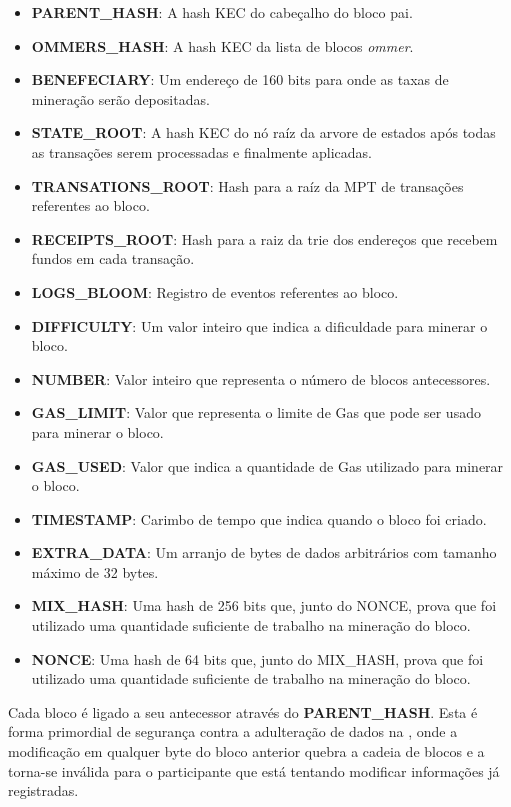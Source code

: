 \documentclass[tcc,capa]{texufpel}
\begin{document}
	\begin{itemize}
	    \item \textbf{PARENT\_HASH}: A hash KEC do cabeçalho do bloco pai.
	    \item \textbf{OMMERS\_HASH}: A hash KEC da lista de blocos \textit{ommer}.
	    \item \textbf{BENEFECIARY}: Um endereço de 160 bits para onde as taxas de mineração serão depositadas.
	    \item \textbf{STATE\_ROOT}: A hash KEC do nó raíz da arvore de estados após todas as transações serem processadas e finalmente aplicadas.
	    \item \textbf{TRANSATIONS\_ROOT}: Hash para a raíz da MPT de transações referentes ao bloco.
	    \item \textbf{RECEIPTS\_ROOT}: Hash para a raiz da trie dos endereços que recebem fundos em cada transação.
	    \item \textbf{LOGS\_BLOOM}: Registro de eventos referentes ao bloco.
	    \item \textbf{DIFFICULTY}: Um valor inteiro que indica a dificuldade para minerar o bloco.
	    \item \textbf{NUMBER}: Valor inteiro que representa o número de blocos antecessores.
	    \item \textbf{GAS\_LIMIT}: Valor que representa o limite de Gas que pode ser usado para minerar o bloco.
	    \item \textbf{GAS\_USED}: Valor que indica a quantidade de Gas utilizado para minerar o bloco.
	    \item \textbf{TIMESTAMP}: Carimbo de tempo que indica quando o bloco foi criado.
	    \item \textbf{EXTRA\_DATA}: Um arranjo de bytes de dados arbitrários com tamanho máximo de 32 bytes.
	    \item \textbf{MIX\_HASH}: Uma hash de 256 bits que, junto do NONCE, prova que foi utilizado uma quantidade suficiente de trabalho na mineração do bloco.
	    \item \textbf{NONCE}: Uma hash de 64 bits que, junto do MIX\_HASH, prova que foi utilizado uma quantidade suficiente de trabalho na mineração do bloco.
	\end{itemize}
	
	Cada bloco é ligado a seu antecessor através do \textbf{PARENT\_HASH}. Esta é forma primordial de segurança contra a adulteração de dados na \bchain, onde a modificação em qualquer byte do bloco anterior quebra a cadeia de blocos e a \bchain torna-se inválida para o participante que está tentando modificar informações já registradas.
	
\end{document}
